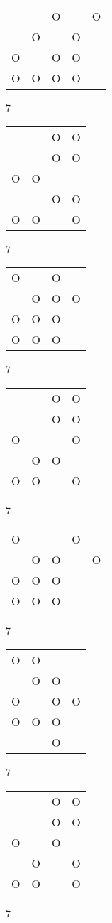 \begin{tabular}{|m{0.2cm}m{0.2cm}m{0.2cm}m{0.2cm}m{0.2cm}|}\hline
 & &O& &O\\
 &O& &O& \\
O& &O&O& \\
O&O&O&O& \\
\hline\end{tabular}7
\begin{tabular}{|m{0.2cm}m{0.2cm}m{0.2cm}m{0.2cm}|}\hline
 & &O&O\\
 & &O&O\\
O&O& & \\
 & &O&O\\
O&O& &O\\
\hline\end{tabular}7
\begin{tabular}{|m{0.2cm}m{0.2cm}m{0.2cm}m{0.2cm}|}\hline
O& &O& \\
 &O&O&O\\
O&O&O& \\
O&O&O& \\
\hline\end{tabular}7
\begin{tabular}{|m{0.2cm}m{0.2cm}m{0.2cm}m{0.2cm}|}\hline
 & &O&O\\
 & &O&O\\
O& & &O\\
 &O&O& \\
O&O& &O\\
\hline\end{tabular}7
\begin{tabular}{|m{0.2cm}m{0.2cm}m{0.2cm}m{0.2cm}m{0.2cm}|}\hline
O& & &O& \\
 &O&O& &O\\
O&O&O& & \\
O&O&O& & \\
\hline\end{tabular}7
\begin{tabular}{|m{0.2cm}m{0.2cm}m{0.2cm}m{0.2cm}|}\hline
O&O& & \\
 &O&O& \\
O& &O&O\\
O&O&O& \\
 & &O& \\
\hline\end{tabular}7
\begin{tabular}{|m{0.2cm}m{0.2cm}m{0.2cm}m{0.2cm}|}\hline
 & &O&O\\
 & &O&O\\
O& &O& \\
 &O& &O\\
O&O& &O\\
\hline\end{tabular}7
